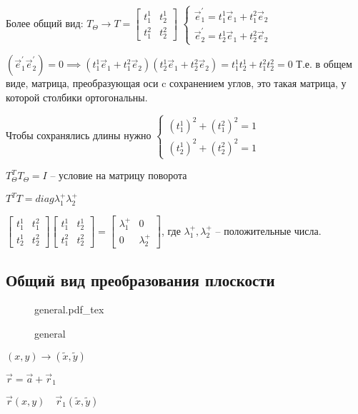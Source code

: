 \documentclass{book}
\newcommand{\p}[1]{#1^{\prime}}
\newcommand{\tl}[1]{\widetilde{#1}}
\theoremstyle{definition}
\newcommand{\incfig}[1]{%
    \def\svgwidth{\columnwidth}
    {#1.pdf_tex}
}
\begin{document}
Более общий вид: $T_{\Theta} \to T = \begin{bmatrix} t_1^1 & t_2^1\\t_1^2&t_2^2 \end{bmatrix} $
$\begin{cases}
    
\p{\vec e_1} = t_1^1\vec e_1 + t_1^2\vec e_2\\
\p{\vec e_2} = t_2^1\vec e_1 + t_2^2\vec e_2
\end{cases}$

$(\p{\vec e_1}\p{\vec e_2}) = 0 \implies (t_1^1\vec e_1 + t_1^2\vec e_2)(t_2^1\vec e_1 + t_2^2\vec e_2) = t_1^1t_2^1 + t_1^2t_2^2 = 0$ Т.е. в общем виде, матрица, преобразующая оси c сохранением углов, это такая матрица, у которой столбики ортогональны. 

Чтобы сохранялись длины нужно $\begin{cases}
    (t_1^1)^2 + (t_1^2)^2 = 1\\
    (t_2^1)^2 + (t_2^2)^2 =1
\end{cases}$

$T^T_{\Theta}T_{\Theta} = I$ -- условие на матрицу поворота

$T^TT = diag{\lambda_1^+\lambda_2^+}$

$\begin{bmatrix} t_1^1 & t_1^2\\t_2^1&t_2^2 \end{bmatrix} \begin{bmatrix} t_1^1 & t_2^1\\t_1^2 & t_2^2 \end{bmatrix}  = \begin{bmatrix} \lambda_1^+ & 0\\0 & \lambda_2^+ \end{bmatrix} $, где $\lambda_1^+, \lambda_2^+$ -- положительные числа.

\subsection{Общий вид преобразования плоскости}
\begin{figure}[ht]
    \centering
    \incfig{general}
    \caption{general}
    \label{fig:general}
\end{figure}

$(x, y) \to  (\tl x, \tl y)$

$\vec r = \vec a + \vec r_1$
 
$\vec r(x, y)\quad \vec r_1(\tl x, \tl y)$
\end{document}
